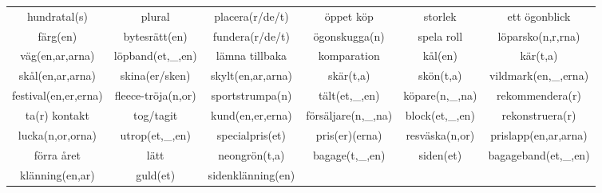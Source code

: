 \begin{center}
\begin{adjustwidth}{-2cm}{}
\begin{tabular}{|c c c c c c|}
            hundratal(s) & plural & placera(r/de/t) & öppet köp & storlek & ett ögonblick \\
            färg(en) & bytesrätt(en) & fundera(r/de/t) & ögonskugga(n) & spela roll & löparsko(n,r,rna) \\
            väg(en,ar,arna) & löpband(et,\_,en) & lämna tillbaka & komparation & kål(en) & kär(t,a) \\
            skål(en,ar,arna) & skina(er/sken) & skylt(en,ar,arna) & skär(t,a) & skön(t,a) & vildmark(en,\_,erna) \\
            festival(en,er,erna) & fleece-tröja(n,or) & sportstrumpa(n) & tält(et,\_,en) & köpare(n,\_,na) & rekommendera(r) \\
            ta(r) kontakt & tog/tagit & kund(en,er,erna) & försäljare(n,\_,na) & block(et,\_,en) & rekonstruera(r) \\
            lucka(n,or,orna) & utrop(et,\_,en) & specialpris(et) & pris(er)(erna) & resväska(n,or) & prislapp(en,ar,arna) \\
            förra året & lätt & neongrön(t,a) & bagage(t,\_,en) & siden(et) & bagageband(et,\_,en) \\
            klänning(en,ar) & guld(et) & sidenklänning(en) &  &  &  \\
            \hline
        \end{tabular}
    \end{adjustwidth}
\end{center}

